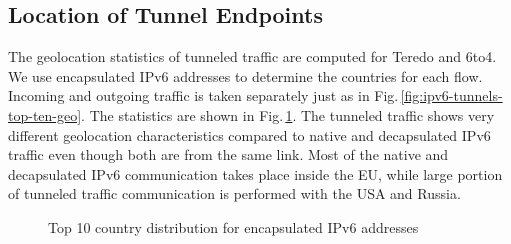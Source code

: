 \subsection{Location of Tunnel Endpoints}
The geolocation statistics of tunneled traffic are computed for Teredo and 6to4. We use encapsulated IPv6 addresses to determine the countries for each flow. Incoming and outgoing traffic is taken separately just as in Fig.\,\ref{fig:ipv6-tunnels-top-ten-geo}. The statistics are shown in Fig.\,\ref{fig:ipv6-tunnels-geo-tun-both}.
The tunneled traffic shows very different geolocation characteristics compared to native and decapsulated IPv6 traffic even though both are from the same link. 
Most of the native and decapsulated IPv6 communication takes place inside the EU, while large portion of tunneled traffic communication is performed with the USA and Russia. 

\begin{figure}[!tb]
     \hspace{2mm}
    \caption{Top 10 country distribution for encapsulated IPv6 addresses}
    \label{fig:ipv6-tunnels-geo-tun-both}
\end{figure}

